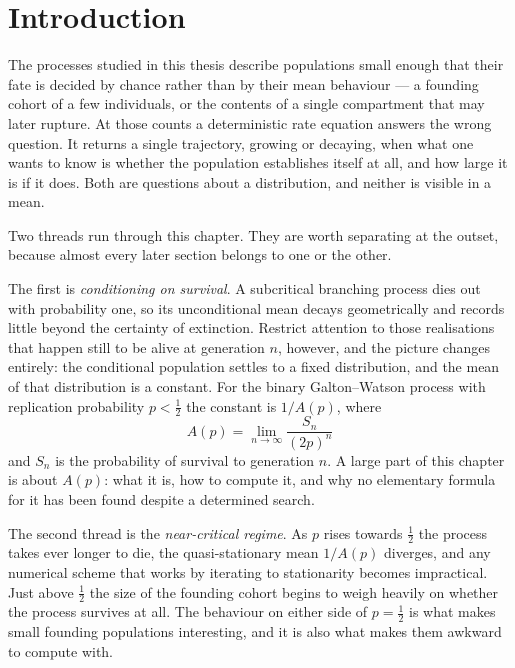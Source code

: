 \section{Introduction}
\label{sec:intro}

The processes studied in this thesis describe populations small enough that their
fate is decided by chance rather than by their mean behaviour --- a founding cohort
of a few individuals, or the contents of a single compartment that may later
rupture. At those counts a deterministic rate equation answers the wrong question.
It returns a single trajectory, growing or decaying, when what one wants to know is
whether the population establishes itself at all, and how large it is if it does.
Both are questions about a distribution, and neither is visible in a mean.

Two threads run through this chapter. They are worth separating at the outset,
because almost every later section belongs to one or the other.

The first is \emph{conditioning on survival}. A subcritical branching process dies
out with probability one, so its unconditional mean decays geometrically and
records little beyond the certainty of extinction. Restrict attention to those
realisations that happen still to be alive at generation $n$, however, and the
picture changes entirely: the conditional population settles to a fixed
distribution, and the mean of that distribution is a constant. For the binary
Galton--Watson process with replication probability $p<\tfrac12$ the constant is
$1/A(p)$, where
\begin{equation*}
A(p) = \lim_{n\to\infty}\frac{S_n}{(2p)^n}
\end{equation*}
and $S_n$ is the probability of survival to generation $n$. A large part of this
chapter is about $A(p)$: what it is, how to compute it, and why no elementary
formula for it has been found despite a determined search.

The second thread is the \emph{near-critical regime}. As $p$ rises towards
$\tfrac12$ the process takes ever longer to die, the quasi-stationary mean $1/A(p)$
diverges, and any numerical scheme that works by iterating to stationarity becomes
impractical. Just above $\tfrac12$ the size of the founding cohort begins to weigh
heavily on whether the process survives at all. The behaviour on either side of
$p=\tfrac12$ is what makes small founding populations interesting, and it is also
what makes them awkward to compute with.

